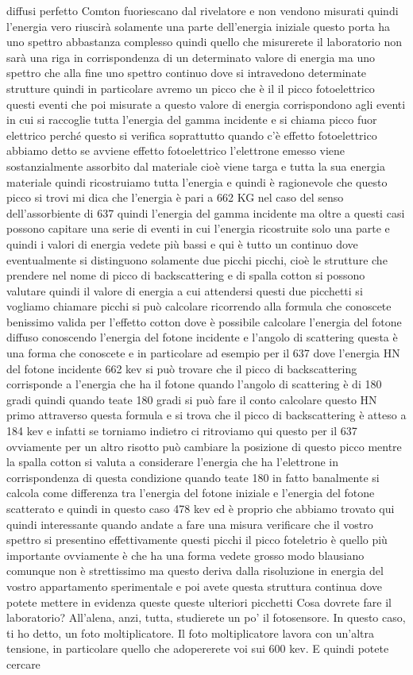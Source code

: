 diffusi perfetto Comton fuoriescano dal rivelatore e non vendono misurati quindi l'energia vero riuscirà solamente una parte dell'energia iniziale questo porta ha uno spettro abbastanza complesso quindi quello che misurerete il laboratorio non sarà una riga in corrispondenza di un determinato valore di energia ma uno spettro che alla fine uno spettro continuo dove si intravedono determinate strutture quindi in particolare avremo un picco che è il il picco fotoelettrico questi eventi che poi misurate a questo valore di energia corrispondono agli eventi in cui si raccoglie tutta l'energia del gamma incidente e si chiama picco fuor elettrico perché questo si verifica soprattutto quando c'è effetto fotoelettrico abbiamo detto se avviene effetto fotoelettrico l'elettrone emesso viene sostanzialmente assorbito dal materiale cioè viene targa e tutta la sua energia materiale quindi ricostruiamo tutta l'energia e quindi è ragionevole che questo picco si trovi mi dica che l'energia è pari a 662 KG nel caso del senso dell'assorbiente di 637 quindi l'energia del gamma incidente ma oltre a questi casi possono capitare una serie di eventi in cui l'energia ricostruite solo una parte e quindi i valori di energia vedete più bassi e qui è tutto un continuo dove eventualmente si distinguono solamente due picchi picchi, cioè le strutture che prendere nel nome di picco di backscattering e di spalla cotton si possono valutare quindi il valore di energia a cui attendersi questi due picchetti si vogliamo chiamare picchi si può calcolare ricorrendo alla formula che conoscete benissimo valida per l'effetto cotton dove è possibile calcolare l'energia del fotone diffuso conoscendo l'energia del fotone incidente e l'angolo di scattering questa è una forma che conoscete e in particolare ad esempio per il 637 dove l'energia HN del fotone incidente 662 kev si può trovare che il picco di backscattering corrisponde a l'energia che ha il fotone quando l'angolo di scattering è di 180 gradi quindi quando teate 180 gradi si può fare il conto calcolare questo HN primo attraverso questa formula e si trova che il picco di backscattering è atteso a 184 kev e infatti se torniamo indietro ci ritroviamo qui questo per il 637 ovviamente per un altro risotto può cambiare la posizione di questo picco mentre la spalla cotton si valuta a considerare l'energia che ha l'elettrone in corrispondenza di questa condizione quando teate 180 in fatto banalmente si calcola come differenza tra l'energia del fotone iniziale e l'energia del fotone scatterato e quindi in questo caso 478 kev ed è proprio che abbiamo trovato qui quindi interessante quando andate a fare una misura verificare che il vostro spettro si presentino effettivamente questi picchi il picco foteletrio è quello più importante ovviamente è che ha una forma vedete grosso modo blausiano comunque non è strettissimo ma questo deriva dalla risoluzione in energia del vostro appartamento sperimentale e poi avete questa struttura continua dove potete mettere in evidenza queste queste ulteriori picchetti Cosa dovrete fare il laboratorio? All'alena, anzi, tutta, studierete un po' il fotosensore. In questo caso, ti ho detto, un foto moltiplicatore. Il foto moltiplicatore lavora con un'altra tensione, in particolare quello che adopererete voi sui 600 kev. E quindi potete cercare 
